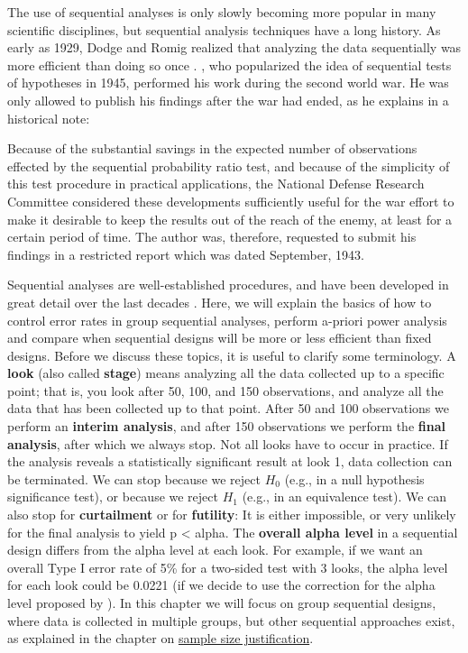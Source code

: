 \documentclass[
  oneside]{krantz}
\renewenvironment{quote}{\begin{VF}}{\end{VF}}
\begin{document}
The use of sequential analyses is only slowly becoming more popular in many scientific disciplines, but sequential analysis techniques have a long history. As early as 1929, Dodge and Romig realized that analyzing the data sequentially was more efficient than doing so once \citep{dodge_method_1929}. \citet{wald_sequential_1945}, who popularized the idea of sequential tests of hypotheses in 1945, performed his work during the second world war. He was only allowed to publish his findings after the war had ended, as he explains in a historical note:

\begin{quote}
Because of the substantial savings in the expected number of observations effected by the sequential probability ratio test, and because of the simplicity of this test procedure in practical applications, the National Defense Research Committee considered these developments sufficiently useful for the war effort to make it desirable to keep the results out of the reach of the enemy, at least for a certain period of time. The author was, therefore, requested to submit his findings in a restricted report which was dated September, 1943.
\end{quote}

Sequential analyses are well-established procedures, and have been developed in great detail over the last decades \citep{proschan_statistical_2006, jennison_group_2000, wassmer_group_2016}. Here, we will explain the basics of how to control error rates in group sequential analyses, perform a-priori power analysis and compare when sequential designs will be more or less efficient than fixed designs. Before we discuss these topics, it is useful to clarify some terminology. A \textbf{look} (also called \textbf{stage}) means analyzing all the data collected up to a specific point; that is, you look after 50, 100, and 150 observations, and analyze all the data that has been collected up to that point. After 50 and 100 observations we perform an \textbf{interim analysis}, and after 150 observations we perform the \textbf{final analysis}, after which we always stop. Not all looks have to occur in practice. If the analysis reveals a statistically significant result at look 1, data collection can be terminated. We can stop because we reject \(H_0\) (e.g., in a null hypothesis significance test), or because we reject \(H_1\) (e.g., in an equivalence test). We can also stop for \textbf{curtailment} or for \textbf{futility}: It is either impossible, or very unlikely for the final analysis to yield p \textless{} alpha. The \textbf{overall alpha level} in a sequential design differs from the alpha level at each look. For example, if we want an overall Type I error rate of 5\% for a two-sided test with 3 looks, the alpha level for each look could be 0.0221 (if we decide to use the correction for the alpha level proposed by \citet{pocock_group_1977}). In this chapter we will focus on group sequential designs, where data is collected in multiple groups, but other sequential approaches exist, as explained in the chapter on \protect\hyperlink{sequentialsamplesize}{sample size justification}.
\end{document}
